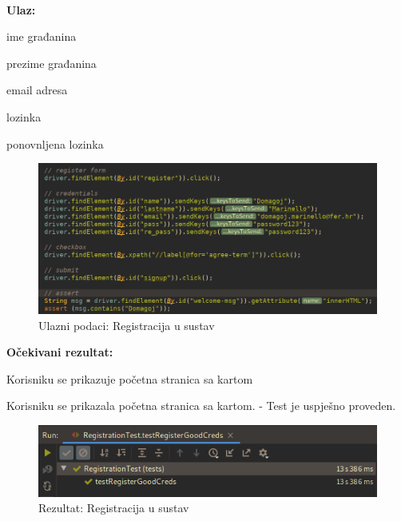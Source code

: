 			\noindent {}
			
			\
			
			\noindent \textbf{Ulaz:}
			
			\begin{packed_enum}
				\item ime građanina
				\item prezime građanina			
				\item email adresa
				\item lozinka
				\item ponovnljena lozinka
				
				
			\end{packed_enum}

			\begin{figure}[H]
					\includegraphics[scale=0.57]{figures/register-code.PNG}
					\centering
					\caption{Ulazni podaci: Registracija u sustav}
					\label{fig:Registracija u sustav}
				\end{figure}	
			
			\noindent \textbf{Očekivani rezultat:}
				\begin{packed_enum}
				\item Korisniku se prikazuje početna stranica sa kartom
							
				
			\end{packed_enum}
			
		
			Korisniku se prikazala početna stranica sa kartom. - Test je uspješno proveden.			


			\begin{figure}[H]
					\includegraphics[scale=0.57]{figures/registe-pass.PNG}
					\centering
					\caption{Rezultat: Registracija u sustav}
					\label{fig:Registracija u sustav}
				\end{figure}
			
